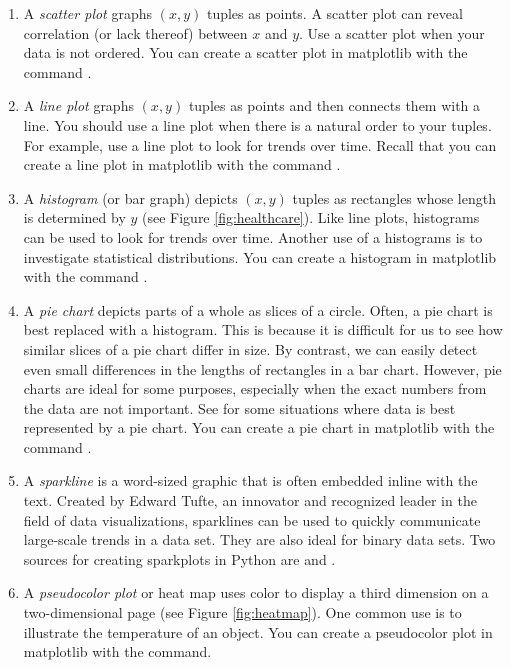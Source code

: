 \begin{enumerate}
\item A \emph{scatter plot} graphs $(x,y)$ tuples as points. 
A scatter plot can reveal correlation (or lack thereof) between $x$ and $y$. 
Use a scatter plot when your data is not ordered. 
You can create a scatter plot in matplotlib with the command .

\item A \emph{line plot} graphs $(x,y)$ tuples as points and then connects them with a line. 
You should use a line plot when there is a natural order to your tuples. 
For example, use a line plot to look for trends over time. 
Recall that you can create a line plot in matplotlib with the command .

\item A \emph{histogram} (or bar graph) depicts $(x,y)$ tuples as rectangles whose length is determined by $y$ (see Figure \ref{fig:healthcare}). 
Like line plots, histograms can be used to look for trends over time. 
Another use of a histograms is to investigate statistical distributions. 
You can create a histogram in matplotlib with the command . 

\item A \emph{pie chart} depicts parts of a whole as slices of a circle. 
Often, a pie chart is best replaced with a histogram. 
This is because it is difficult for us to see how similar slices of a pie chart differ in size. 
By contrast, we can easily detect even small differences in the lengths of rectangles in a bar chart. 
However, pie charts are ideal for some purposes, especially when the exact numbers from the data are not important. 
See \cite{piecharts} for some situations where data is best represented by a pie chart. 
You can create a pie chart in matplotlib with the command .

\item A \emph{sparkline} is a word-sized graphic that is often embedded inline with the text. 
Created by Edward Tufte, an innovator and recognized leader in the field of data visualizations, sparklines can be used to quickly communicate large-scale trends in a data set. They are also ideal for binary data sets. 
Two sources for creating sparkplots in Python are \cite{sparkplots} and \cite{sparklineshtml}.

\item A \emph{pseudocolor plot} or heat map uses color to display a third dimension on a two-dimensional page (see Figure \ref{fig:heatmap}). 
One common use is to illustrate the temperature of an object. 
You can create a pseudocolor plot in matplotlib with the  command.


\end{enumerate}
